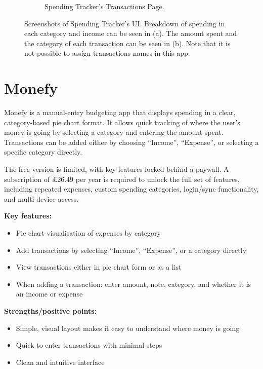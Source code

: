\documentclass{l4proj}
\begin{document}
\begin{appendices}
\begin{figure}[h]
\begin{subfigure}[t]{0.25\textwidth}
        \caption{Spending Tracker's Transactions Page.}
        \label{fig:syn2}
    \end{subfigure}
    \caption{Screenshots of Spending Tracker's UI. Breakdown of spending in each category and income can be seen in (a). The amount spent and the category of each transaction can be seen in (b). Note that it is not possible to assign transactions names in this app.}
    \label{fig:synthetic}
\end{figure}

\section{Monefy}
Monefy is a manual-entry budgeting app that displays spending in a clear, category-based pie chart format. It allows quick tracking of where the user’s money is going by selecting a category and entering the amount spent. Transactions can be added either by choosing “Income”, “Expense”, or selecting a specific category directly.

The free version is limited, with key features locked behind a paywall. A subscription of £26.49 per year is required to unlock the full set of features, including repeated expenses, custom spending categories, login/sync functionality, and multi-device access.

\vspace{0.5em}
\textbf{Key features:}
\begin{itemize}
    \item Pie chart visualisation of expenses by category
    \item Add transactions by selecting “Income”, “Expense”, or a category directly
    \item View transactions either in pie chart form or as a list
    \item When adding a transaction: enter amount, note, category, and whether it is an income or expense
\end{itemize}
\vspace{0.5em}

\textbf{Strengths/positive points:}
\begin{itemize}
    \item Simple, visual layout makes it easy to understand where money is going
    \item Quick to enter transactions with minimal steps
    \item Clean and intuitive interface
\end{itemize}
\vspace{0.5em}


\end{appendices}
\end{document}
